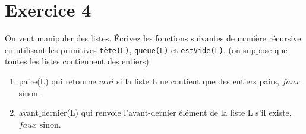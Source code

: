 \documentclass[10pt,a4paper]{article}
\begin{document}
\section*{Exercice 4}
On veut manipuler des listes. Écrivez les fonctions suivantes de manière récursive en utilisant les primitives \texttt{tête(L)}, \texttt{queue(L)} et \texttt{estVide(L)}. %
(on suppose que toutes les listes contiennent des entiers) 
\begin{enumerate}
 \item paire(L) qui retourne $vrai$ si la liste L ne contient que des entiers pairs, $faux$ sinon.
\item avant$\_$dernier(L) qui renvoie l'avant-dernier élément de la liste L s'il existe, $faux$ sinon.
\end{enumerate}
\end{document}
